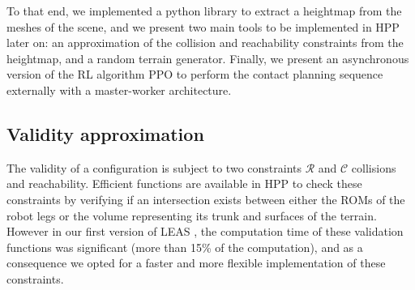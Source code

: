 To that end, we implemented a python library to extract a heightmap from the meshes of the scene, and we present two main tools to be implemented in HPP later on: an approximation of the collision and reachability constraints from the heightmap, and a random terrain generator. 
Finally, we present an asynchronous version of the RL algorithm PPO to perform the contact planning sequence externally with a master-worker architecture.

\subsection{Validity approximation\label{subsub:validity_approximation}}
The validity of a configuration is subject to two constraints $\mathcal{R}$ and $\mathcal{C}$ collisions and reachability.
Efficient functions are available in HPP to check these constraints by verifying if an intersection exists between either the ROMs of the robot legs or the volume representing its trunk and surfaces of the terrain. 
However in our first version of LEAS \cite{LEAS}, the computation time of these validation functions was significant (more than 15\% of the computation), and as a consequence we opted for a faster and more flexible implementation of these constraints.

